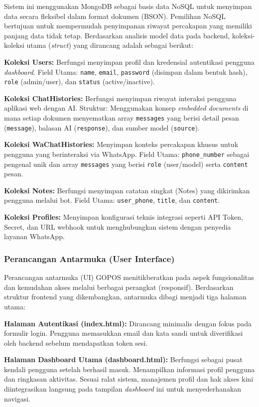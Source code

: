 Sistem ini menggunakan MongoDB sebagai basis data NoSQL untuk menyimpan data secara fleksibel dalam format dokumen (BSON). Pemilihan NoSQL bertujuan untuk mempermudah penyimpanan riwayat percakapan yang memiliki panjang data tidak tetap. Berdasarkan analisis model data pada backend, koleksi-koleksi utama (\textit{struct}) yang dirancang adalah sebagai berikut:

\textbf{Koleksi Users:}
Berfungsi menyimpan profil dan kredensial autentikasi pengguna \textit{dashboard}. Field Utama: \texttt{name}, \texttt{email}, \texttt{password} (disimpan dalam bentuk hash), \texttt{role} (admin/user), dan \texttt{status} (active/inactive).

\textbf{Koleksi ChatHistories:}
Berfungsi menyimpan riwayat interaksi pengguna aplikasi web dengan AI. Struktur: Menggunakan konsep \textit{embedded documents} di mana setiap dokumen menyematkan array \texttt{messages} yang berisi detail pesan (\texttt{message}), balasan AI (\texttt{response}), dan sumber model (\texttt{source}).

\textbf{Koleksi WaChatHistories:}
Menyimpan konteks percakapan khusus untuk pengguna yang berinteraksi via WhatsApp. Field Utama: \texttt{phone\_number} sebagai pengenal unik dan array \texttt{messages} yang berisi \texttt{role} (user/model) serta \texttt{content} pesan.

\textbf{Koleksi Notes:}
Berfungsi menyimpan catatan singkat (Notes) yang dikirimkan pengguna melalui bot. Field Utama: \texttt{user\_phone}, \texttt{title}, dan \texttt{content}.

\textbf{Koleksi Profiles:}
Menyimpan konfigurasi teknis integrasi seperti API Token, Secret, dan URL webhook untuk menghubungkan sistem dengan penyedia layanan WhatsApp.

\subsubsection{Perancangan Antarmuka (User Interface)}

Perancangan antarmuka (UI) GOPOS menitikberatkan pada aspek fungsionalitas dan kemudahan akses melalui berbagai perangkat (responsif). Berdasarkan struktur frontend yang dikembangkan, antarmuka dibagi menjadi tiga halaman utama:

\textbf{Halaman Autentikasi (index.html):}
Dirancang minimalis dengan fokus pada formulir login. Pengguna memasukkan email dan kata sandi untuk diverifikasi oleh backend sebelum mendapatkan token sesi.

\textbf{Halaman Dashboard Utama (dashboard.html):}
Berfungsi sebagai pusat kendali pengguna setelah berhasil masuk. Menampilkan informasi profil pengguna dan ringkasan aktivitas. Sesuai ralat sistem, manajemen profil dan hak akses kini diintegrasikan langsung pada tampilan \textit{dashboard} ini untuk menyederhanakan navigasi.

